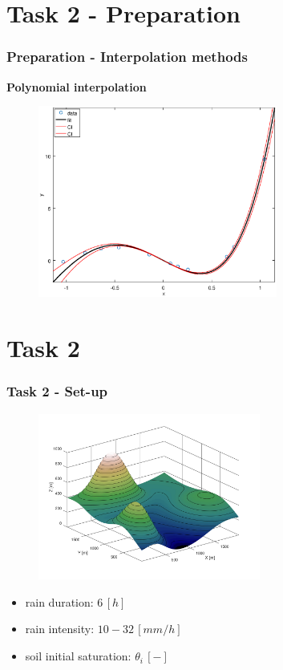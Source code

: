 \documentclass[xcolor=dvipsnames, USenglish]{beamer}  %
\begin{document}
\section{Task 2 - Preparation}
  \begin{frame}
    \frametitle{Preparation - Interpolation methods}
    \large{\textbf{Polynomial interpolation}}\\
    \begin{figure}[t]
      \centering
      \includegraphics[width=0.7\textwidth]{img/interpolation.eps}
    \end{figure}
  \end{frame}


\section{Task 2}
  \begin{frame}
    \frametitle{Task 2 - Set-up}
    \begin{figure}[t]
      \centering
      \includegraphics[width=0.65\textwidth]{img/topography.png}
    \end{figure}
    \begin{itemize}
      \item rain duration: $6\,[h]$
      \item rain intensity: $10 - 32\,[mm/h]$
      \item soil initial saturation: $\theta_i\,[-]$
    \end{itemize}
  \end{frame}
\end{document}
